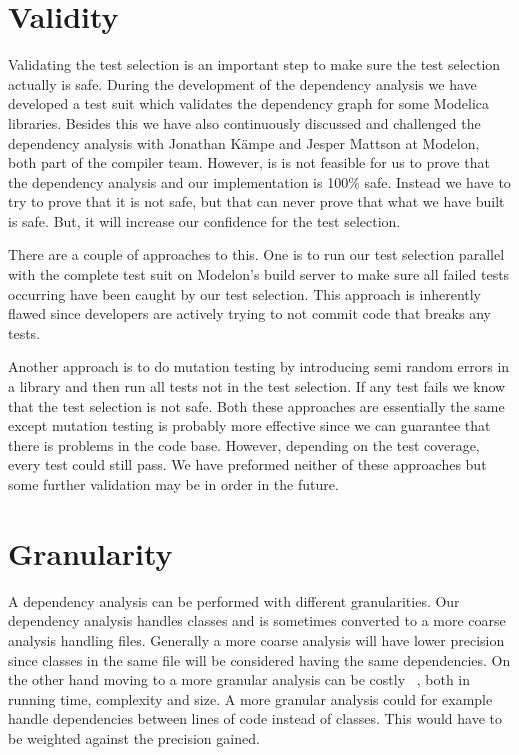 \documentclass{cslthse-msc}
\begin{document}
\section{Validity}
Validating the test selection is an important step to make sure the test selection actually is safe. During the development of the dependency analysis we have developed a test suit which validates the dependency graph for some Modelica libraries. Besides this we have also continuously discussed and challenged the dependency analysis with Jonathan Kämpe and Jesper Mattson at Modelon, both part of the compiler team. However, is is not feasible for us to prove that the dependency analysis and our implementation is 100\% safe. Instead we have to try to prove that it is not safe, but that can never prove that what we have built is safe. But, it will increase our confidence for the test selection. 

There are a couple of approaches to this. One is to run our test selection parallel with the complete test suit on Modelon's build server to make sure all failed tests occurring have been caught by our test selection. This approach is inherently flawed since developers are actively trying to not commit code that breaks any tests.

Another approach is to do mutation testing by introducing semi random errors in a library and then run all tests not in the test selection. If any test fails we know that the test selection is not safe. Both these approaches are essentially the same except mutation testing is probably more effective since we can guarantee that there is problems in the code base. However, depending on the test coverage, every test could still pass. We have preformed neither of these approaches but some further validation may be in order in the future.

\section{Granularity}
A dependency analysis can be performed with different granularities. Our dependency analysis handles classes and is sometimes converted to a more coarse analysis handling files. Generally a more coarse analysis will have lower precision since classes in the same file will be considered having the same dependencies. On the other hand moving to a more granular analysis can be costly ~\cite{DBLP:conf/sigsoft/LegunsenHSLZM16}, both in running time, complexity and size. A more granular analysis could for example handle dependencies between lines of code instead of classes. This would have to be weighted against the precision gained.
\end{document}
